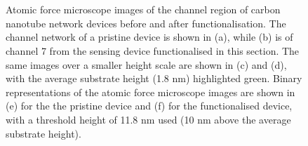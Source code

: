 \documentclass[
  a4paper,
]{scrbook}
\begin{document}
\begin{figure}
\begin{minipage}[t]{0.01\linewidth}
{\centering 

~

}

\end{minipage}%
%
\begin{minipage}[t]{0.45\linewidth}

{\centering 


}

\end{minipage}%
%
\begin{minipage}[t]{0.01\linewidth}

{\centering 

~

}

\end{minipage}%

\caption{\label{fig-working-OR22a-AFM}Atomic force microscope images of
the channel region of carbon nanotube network devices before and after
functionalisation. The channel network of a pristine device is shown in
(a), while (b) is of channel 7 from the sensing device functionalised in
this section. The same images over a smaller height scale are shown in
(c) and (d), with the average substrate height (1.8 nm) highlighted
green. Binary representations of the atomic force microscope images are
shown in (e) for the the pristine device and (f) for the functionalised
device, with a threshold height of 11.8 nm used (10 nm above the average
substrate height).}

\end{figure}
\end{document}
